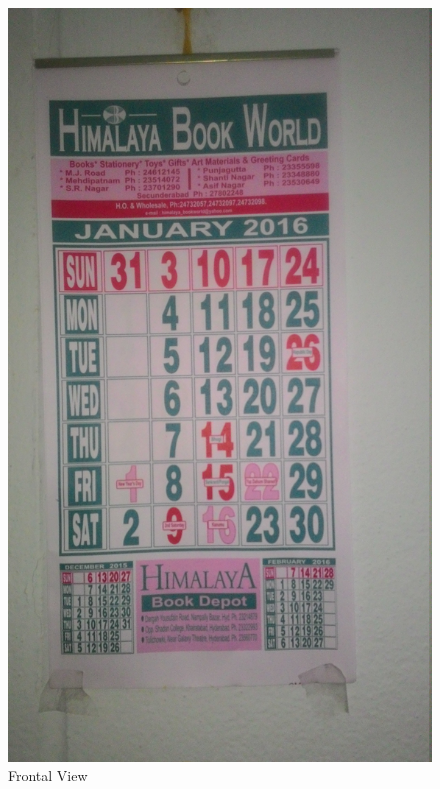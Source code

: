 \documentclass[12pt]{article}
\begin{document}
\begin{figure}[h]
\centering
\begin{minipage}{0.7\textwidth}
\centering
\includegraphics[scale = 0.07]{cal1.jpg}
\caption{Frontal View}
\label{fig:Image 1}
\end{minipage}%
\begin{minipage}{.5\textwidth}
\centering

\end{minipage}
\end{figure}
\end{document}
